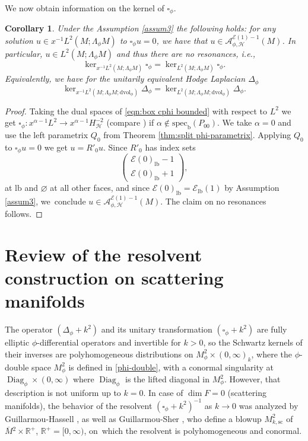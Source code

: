 \documentclass[11pt]{article}
\newcommand{\ie}{i.e.,\xspace}
\numberwithin{equation}{section}
\theoremstyle{plain}
\newtheorem{Cor}[Th]{Corollary}
\theoremstyle{definition}
\newcommand{\R}{{\mathbb{R}}}
\newcommand\calA{{\mathcal A}}
\newcommand\calE{{\mathcal E}}
\newcommand{\lf}{{\mathrm{lb}}}
\newcommand{\bb}{{\mathrm{b}}}
\newcommand{\ssc}{{\mathrm{sc}}}
\newcommand{\dvol}{\mathrm{dvol}}
\newcommand{\specb}{\mathrm{spec}_\bb}
\DeclareMathOperator{\Diag}{Diag}
\newcommand{\Hsplit}{H_{\mathscr{H}}}
\newcommand{\Mbar}{{\overline{M}}}\let\M\Mbar
\begin{document}
We now obtain information on the kernel of $\square_\phi$.
\begin{Cor}
\label{cor:kernel}
Under the Assumption \ref{assum3} the following holds:
for any solution $u\in x^{-1}L^2(M;\Lambda_\phi M)$ to $\square_\phi u=0$, we have that
$u\in \calA_{\phi,\mathscr{H}}^{\calE(1)-1}(M)$. In particular, $u\in L^2(M;\Lambda_\phi M)$ and thus
there are no resonances, \ie\vspace*{-3pt}
\[
\ker_{x^{-1}L^2(M;\Lambda_\phi M)} \square_\phi = \ker_{L^2(M;\Lambda_\phi M)} \square_\phi.
\]
Equivalently, we have for the unitarily equivalent Hodge Laplacian $\Delta_{\phi}$\vspace*{-3pt}
\[
\ker_{x^{-1}L^2(M;\Lambda_\phi M; \dvol_\phi)} \Delta_{\phi} = \ker_{L^2(M; \Lambda_\phi M;\dvol_\phi)} \Delta_{\phi}.
\]
\end{Cor}
\begin{proof}
Taking the dual spaces of \eqref{eqn:box cphi bounded} with respect to $L^2$ we get
$\square_\phi: x^{\alpha-1}L^2 \to x^{\alpha-1} \Hsplit^{-2}$
(compare \cite[Th.\,13]{grieser-para}) if $\alpha\not\in \specb(P_{00})$. We take $\alpha=0$ and use the left parametrix $Q_0$ from Theorem \ref{thm:split phi-parametrix}. Applying $Q_0$ to $\square_\phi u=0$ we get $u=R'_0u$. Since
$R'_0$ has index sets
\[
\begin{pmatrix}
\calE(0)_\lf-1 \\ \calE(0)_\lf+1
\end{pmatrix},
\]
at $\lf$ and $\varnothing$ at all other faces, and since $\calE(0)_\lf=\calE_\lf(1)$ by Assumption \ref{assum3},
we~conclude $u\in \calA_{\phi,\mathscr{H}}^{\calE(1)-1}(M)$. The claim on no resonances follows.
\end{proof}

\section{Review of the resolvent construction on scattering manifolds}
\label{section 3}
The operator $(\Delta_{\phi} + k^2)$ and its unitary transformation
$(\square_{\phi} + k^2)$ are fully elliptic $\phi$\nobreakdash-differential operators and invertible for $k>0$, so the Schwartz kernels of their inverses are
polyhomogeneous distributions on $M^2_\phi \times (0,\infty)_k$, where
the $\phi$-double space $M_\phi^2$ is defined in \eqref{phi-double}, with a conormal singularity at $\Diag_\phi\times(0,\infty)$ where $\Diag_\phi$ is the lifted diagonal in $M^2_\phi$. However, that description
is not uniform up to $k=0$. In case of $\dim F = 0$ (scattering manifolds), the behavior of the resolvent $(\square_{\phi} + k^2)^{-1}$
as $k\to 0$ was analyzed by Guillarmou-Hassell \cite{guillarmou2008resolvent, guillarmou2009resolvent},
as well as Guillarmou-Sher \cite{guillarmou2014low}, who define
a blowup $M^2_{k, \ssc}$ of $\Mbar{}^2 \times \R^+$, $\R^+=[0,\infty)$,
on~which the resolvent is polyhomogeneous and conormal.
\end{document}
